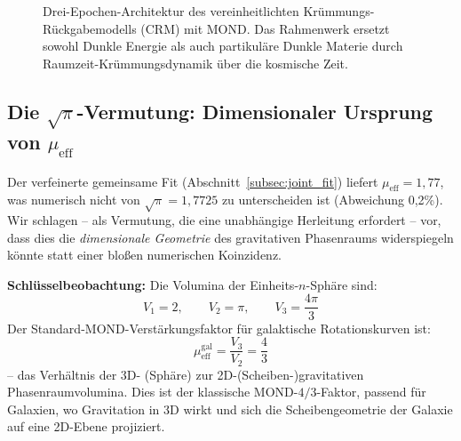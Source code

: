 \documentclass[aps,prd,twocolumn,superscriptaddress,nofootinbib,floatfix]{revtex4-2}
\begin{document}
\begin{figure}[t]
\caption{Drei-Epochen-Architektur des vereinheitlichten Krümmungs-Rückgabemodells (CRM) mit MOND. Das Rahmenwerk ersetzt sowohl Dunkle Energie als auch partikuläre Dunkle Materie durch Raumzeit-Krümmungsdynamik über die kosmische Zeit.}
\label{fig:crm_mond_architektur}
\end{figure}


\subsection{Die \texorpdfstring{$\sqrt{\pi}$}{sqrt(pi)}-Vermutung: Dimensionaler Ursprung von \texorpdfstring{$\mu_{\mathrm{eff}}$}{mu\_eff}}
\label{subsec:sqrt_pi}

Der verfeinerte gemeinsame Fit (Abschnitt~\ref{subsec:joint_fit}) liefert $\mu_{\mathrm{eff}} = 1{,}77$, was numerisch nicht von $\sqrt{\pi} = 1{,}7725$ zu unterscheiden ist (Abweichung 0,2\%). Wir schlagen -- als Vermutung, die eine unabhängige Herleitung erfordert -- vor, dass dies die \textit{dimensionale Geometrie} des gravitativen Phasenraums widerspiegeln könnte statt einer bloßen numerischen Koinzidenz.

\textbf{Schlüsselbeobachtung:} Die Volumina der Einheits-$n$-Sphäre sind:
\begin{equation}
V_1 = 2, \qquad V_2 = \pi, \qquad V_3 = \frac{4\pi}{3}
\end{equation}
Der Standard-MOND-Verstärkungsfaktor für galaktische Rotationskurven ist:
\begin{equation}
\mu_{\mathrm{eff}}^{\mathrm{gal}} = \frac{V_3}{V_2} = \frac{4}{3}
\label{eq:mu_gal}
\end{equation}
-- das Verhältnis der 3D- (Sphäre) zur 2D-(Scheiben-)gravitativen Phasenraumvolumina. Dies ist der klassische MOND-$4/3$-Faktor, passend für Galaxien, wo Gravitation in 3D wirkt und sich die Scheibengeometrie der Galaxie auf eine 2D-Ebene projiziert.
\end{document}
